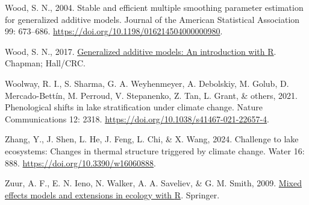 \documentclass[
  letterpaper,
  DIV=11,
  numbers=noendperiod]{scrartcl}
\newlength{\cslhangindent}
\newenvironment{CSLReferences}[2] %
 {\begin{list}{}{%
  \setlength{\itemindent}{0pt}
  \setlength{\leftmargin}{0pt}
  \setlength{\parsep}{0pt}
  \ifodd #1
   \setlength{\leftmargin}{\cslhangindent}
   \setlength{\itemindent}{-1\cslhangindent}
  \fi
  \setlength{\itemsep}{#2\baselineskip}}}
 {\end{list}}
\begin{document}
\begin{CSLReferences}{0}{1}
Wood, S. N., 2004. Stable and efficient multiple smoothing parameter
estimation for generalized additive models. Journal of the American
Statistical Association 99: 673--686.
\url{https://doi.org/10.1198/016214504000000980}.

Wood, S. N., 2017.
\href{https://doi.org/10.1201/9781315370279}{Generalized additive
models: An introduction with {R}}. Chapman; Hall/CRC.

{Woolway, R. I., S. Sharma, G. A. Weyhenmeyer, A. Debolskiy, M. Golub,
D. Mercado-Bettín, M. Perroud, V. Stepanenko, Z. Tan, L. Grant, \&
others}, 2021. Phenological shifts in lake stratification under climate
change. Nature Communications 12: 2318.
\url{https://doi.org/10.1038/s41467-021-22657-4}.

Zhang, Y., J. Shen, L. He, J. Feng, L. Chi, \& X. Wang, 2024. Challenge
to lake ecosystems: Changes in thermal structure triggered by climate
change. Water 16: 888. \url{https://doi.org/10.3390/w16060888}.

Zuur, A. F., E. N. Ieno, N. Walker, A. A. Saveliev, \& G. M. Smith,
2009. \href{https://doi.org/10.1007/978-0-387-87458-6}{Mixed effects
models and extensions in ecology with {R}}. Springer.

\end{CSLReferences}
\end{document}
